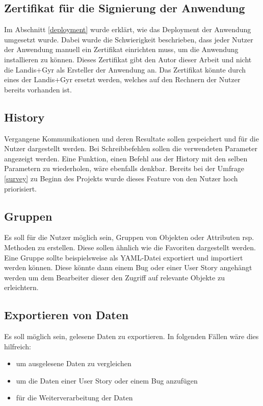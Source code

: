 \subsection{Zertifikat für die Signierung der Anwendung}\label{ausblick:cert}
Im Abschnitt \ref{deployment} wurde erklärt, wie das Deployment der Anwendung umgesetzt wurde.
Dabei wurde die Schwierigkeit beschrieben, dass jeder Nutzer der Anwendung manuell ein Zertifikat einrichten muss, um die Anwendung installieren zu können.
Dieses Zertifikat gibt den Autor dieser Arbeit und nicht die Landis+Gyr als Ersteller der Anwendung an.
Das Zertifikat könnte durch eines der Landis+Gyr ersetzt werden, welches auf den Rechnern der Nutzer bereits vorhanden ist.


\subsection{History}
Vergangene Kommunikationen und deren Resultate sollen gespeichert und für die Nutzer dargestellt werden.
Bei Schreibbefehlen sollen die verwendeten Parameter angezeigt werden.
Eine Funktion, einen Befehl aus der History mit den selben Parametern zu wiederholen, wäre ebenfalls denkbar.
Bereits bei der Umfrage \ref{survey} zu Beginn des Projekts wurde dieses Feature von den Nutzer hoch priorisiert.

\subsection{Gruppen}
Es soll für die Nutzer möglich sein, Gruppen von Objekten oder Attributen rsp. Methoden zu erstellen.
Diese sollen ähnlich wie die Favoriten dargestellt werden.
Eine Gruppe sollte beispielsweise als \ac{YAML}-Datei exportiert und importiert werden können.
Diese könnte dann einem Bug oder einer User Story angehängt werden um dem Bearbeiter dieser den Zugriff auf relevante Objekte zu erleichtern.

\subsection{Exportieren von Daten}
Es soll möglich sein, gelesene Daten zu exportieren.
In folgenden Fällen wäre dies hilfreich:
\begin{itemize}
   \item um ausgelesene Daten zu vergleichen
   \item um die Daten einer User Story oder einem Bug anzufügen
   \item für die Weiterverarbeitung der Daten
\end{itemize}


